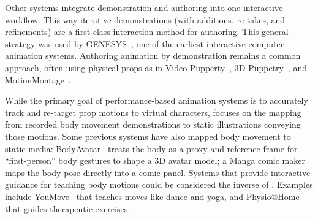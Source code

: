 Other systems integrate demonstration and authoring into one interactive workflow. This way iterative demonstrations (with additions, re-takes, and refinements) are a first-class interaction method for authoring.
This general strategy was used by GENESYS~\cite{Baecker:1969:GENESYS}, one of the earliest interactive computer animation systems. Authoring animation by demonstration remains a common approach, often using physical props as in Video Pupperty~\cite{Barnes:2008:VideoPuppetry}, 3D Puppetry~\cite{held20123d}, and MotionMontage~\cite{Gupta:2014:MotionMontage}.

While the primary goal of performance-based animation systems is to accurately track and re-target prop motions to virtual characters, \systemname{} focuses on the mapping from recorded body movement demonstrations to static illustrations conveying those motions.
Some previous systems have also mapped body movement to static media:
BodyAvatar~\cite{Zhang:2013:BodyAvatar} treats the body as a proxy and reference frame for ``first-person'' body gestures to shape a 3D avatar model;
a Manga comic maker~\cite{lumb_manga_2013} maps the body pose directly into a comic panel.
Systems that provide interactive guidance for teaching body motions could be considered the inverse of \systemname{}. Examples include YouMove~\cite{anderson2013youmove} that teaches moves like dance and yoga, and Physio@Home~\cite{Tang:2014:Physio@Home} that guides therapeutic exercises.
%
%

